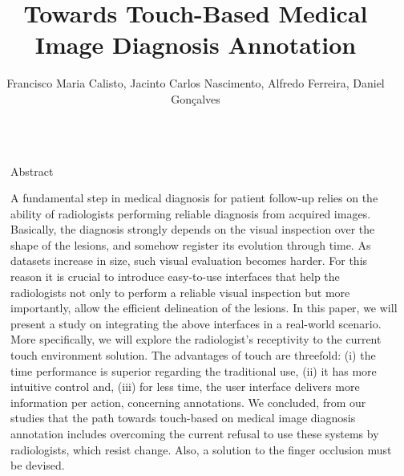 \documentclass[final]{beamer}
\title{Towards Touch-Based Medical Image Diagnosis Annotation} %
\author{Francisco Maria Calisto, Jacinto Carlos Nascimento, Alfredo Ferreira, Daniel Gon\c{c}alves} %
\institute{Institute for Systems and Robotics (ISR/IST), LARSyS, INESC-ID, Instituto Superior T\'{e}cnico, Universidade de Lisboa} %
\newlength{\sepmargin}
\newlength{\onecolwid}
\begin{document}
\setlength{\belowcaptionskip}{2ex} %
\setlength\belowdisplayshortskip{1ex} %


\begin{frame}[t] %

\begin{columns}[t] %

\begin{column}{\sepmargin}\end{column}

\begin{column}{\onecolwid} %


\begin{block}{Abstract}

A fundamental step in medical diagnosis for patient follow-up relies on the ability of radiologists performing reliable diagnosis from acquired images. Basically, the diagnosis strongly depends on the visual inspection over the shape of the lesions, and somehow register its evolution through time. As datasets increase in size, such visual evaluation becomes harder. For this reason it is crucial to introduce easy-to-use interfaces that help the radiologists not only to perform a reliable visual inspection but more importantly, allow the efficient delineation of the lesions. In this paper, we will present a study on integrating the above interfaces in a real-world scenario. More specifically, we will explore the radiologist's receptivity to the current touch environment solution. The advantages of touch are threefold: (i) the time performance is superior regarding the traditional use, (ii) it has more intuitive control and, (iii) for less time, the user interface delivers more information per action, concerning annotations. We concluded, from our studies that the path towards touch-based on medical image diagnosis annotation includes overcoming the current refusal to use these systems by radiologists, which resist change. Also, a solution to the finger occlusion must be devised.

\end{block}


\end{column}
\end{columns}
\end{frame}
\end{document}
